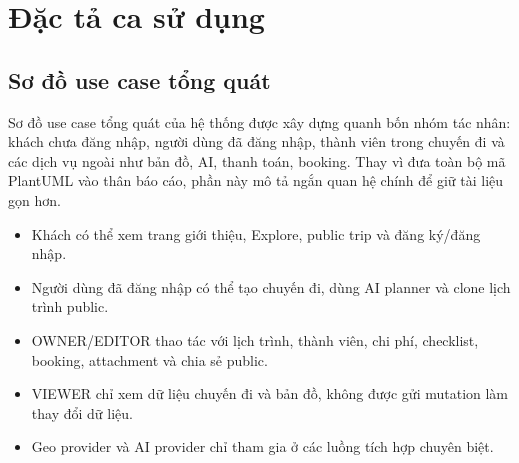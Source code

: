 \documentclass[a4paper]{report}
\begin{document}
\section{Đặc tả ca sử dụng}

\subsection{Sơ đồ use case tổng quát}

Sơ đồ use case tổng quát của hệ thống được xây dựng quanh bốn nhóm tác nhân: khách chưa đăng nhập, người dùng đã đăng nhập, thành viên trong chuyến đi và các dịch vụ ngoài như bản đồ, AI, thanh toán, booking. Thay vì đưa toàn bộ mã PlantUML vào thân báo cáo, phần này mô tả ngắn quan hệ chính để giữ tài liệu gọn hơn.

\begin{itemize}
  \item Khách có thể xem trang giới thiệu, Explore, public trip và đăng ký/đăng nhập.
  \item Người dùng đã đăng nhập có thể tạo chuyến đi, dùng AI planner và clone lịch trình public.
  \item OWNER/EDITOR thao tác với lịch trình, thành viên, chi phí, checklist, booking, attachment và chia sẻ public.
  \item VIEWER chỉ xem dữ liệu chuyến đi và bản đồ, không được gửi mutation làm thay đổi dữ liệu.
  \item Geo provider và AI provider chỉ tham gia ở các luồng tích hợp chuyên biệt.
\end{itemize}
\end{document}
